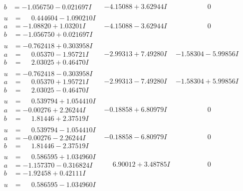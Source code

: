 \documentclass[1p]{elsarticle_modified}
\theoremstyle{definition}
\begin{document}
$$\begin{array}{c|c|c}
\begin{aligned}
b &= -1.056750 - 0.021697 I\end{aligned}
 & -4.15088 + 3.62944 I & \phantom{-0.000000 } 0 \\ \hline\begin{aligned}
u &= \phantom{-}0.444604 - 1.090210 I \\
a &= -1.08820 + 1.03201 I \\
b &= -1.056750 + 0.021697 I\end{aligned}
 & -4.15088 - 3.62944 I & \phantom{-0.000000 } 0 \\ \hline\begin{aligned}
u &= -0.762418 + 0.303958 I \\
a &= \phantom{-}0.05370 - 1.95721 I \\
b &= \phantom{-}2.03025 + 0.46470 I\end{aligned}
 & -2.99313 + 7.49280 I & -1.58304 - 5.99856 I \\ \hline\begin{aligned}
u &= -0.762418 - 0.303958 I \\
a &= \phantom{-}0.05370 + 1.95721 I \\
b &= \phantom{-}2.03025 - 0.46470 I\end{aligned}
 & -2.99313 - 7.49280 I & -1.58304 + 5.99856 I \\ \hline\begin{aligned}
u &= \phantom{-}0.539794 + 1.054410 I \\
a &= -0.00276 + 2.26244 I \\
b &= \phantom{-}1.81446 + 2.37519 I\end{aligned}
 & -0.18858 + 6.80979 I & \phantom{-0.000000 } 0 \\ \hline\begin{aligned}
u &= \phantom{-}0.539794 - 1.054410 I \\
a &= -0.00276 - 2.26244 I \\
b &= \phantom{-}1.81446 - 2.37519 I\end{aligned}
 & -0.18858 - 6.80979 I & \phantom{-0.000000 } 0 \\ \hline\begin{aligned}
u &= \phantom{-}0.586595 + 1.034960 I \\
a &= -1.157370 - 0.316824 I \\
b &= -1.92458 + 0.42111 I\end{aligned}
 & \phantom{-}6.90012 + 3.48785 I & \phantom{-0.000000 } 0 \\ \hline\begin{aligned}
u &= \phantom{-}0.586595 - 1.034960 I \\

\end{aligned}
\end{array}$$
\end{document}
